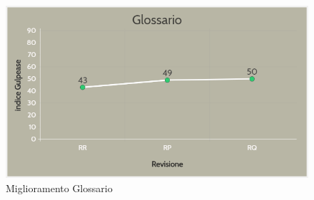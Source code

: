 \begin{figure}[H]
	\centering
	\includegraphics[scale=0.6]{includes/img/G.png}
	\caption{Miglioramento Glossario}
\end{figure}